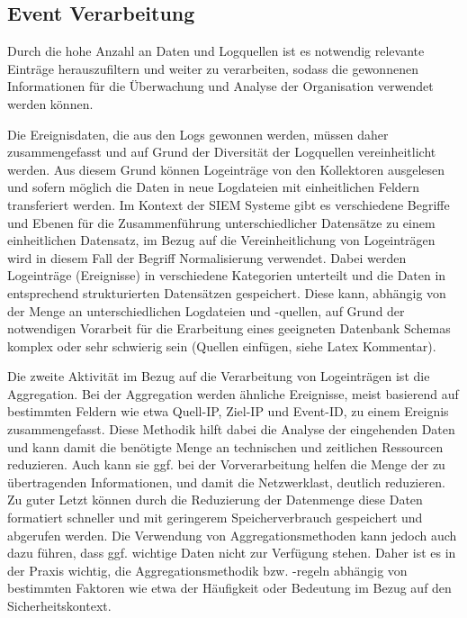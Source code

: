 \subsection{Event Verarbeitung}
\label{cha:Event Verarbeitung}
Durch die hohe Anzahl an Daten und Logquellen ist es notwendig relevante Einträge herauszufiltern und weiter zu verarbeiten, sodass die gewonnenen Informationen für die Überwachung und Analyse der Organisation verwendet werden können.

Die Ereignisdaten, die aus den Logs gewonnen werden, müssen daher zusammengefasst und auf Grund der Diversität der Logquellen vereinheitlicht werden. Aus diesem Grund können Logeinträge von den Kollektoren ausgelesen und sofern möglich die Daten in neue Logdateien mit einheitlichen Feldern transferiert werden. Im Kontext der SIEM Systeme gibt es verschiedene Begriffe und Ebenen für die Zusammenführung unterschiedlicher Datensätze zu einem einheitlichen Datensatz, im Bezug auf die Vereinheitlichung von Logeinträgen wird in diesem Fall der Begriff \glqq Normalisierung \grqq  verwendet. Dabei werden Logeinträge (Ereignisse) in verschiedene Kategorien unterteilt und die Daten in entsprechend strukturierten Datensätzen gespeichert.
Diese kann, abhängig von der Menge an unterschiedlichen Logdateien und -quellen, auf Grund der notwendigen Vorarbeit für die Erarbeitung eines geeigneten Datenbank Schemas komplex oder sehr schwierig sein (Quellen einfügen, siehe Latex Kommentar).

Die zweite Aktivität im Bezug auf die Verarbeitung von Logeinträgen ist die Aggregation. Bei der Aggregation werden ähnliche Ereignisse, meist basierend auf bestimmten Feldern wie etwa Quell-IP, Ziel-IP und Event-ID, zu einem Ereignis zusammengefasst. Diese Methodik hilft dabei die Analyse der eingehenden Daten und kann damit die benötigte Menge an technischen und zeitlichen Ressourcen reduzieren. Auch kann sie ggf. bei der Vorverarbeitung helfen die Menge der zu übertragenden Informationen, und damit die Netzwerklast, deutlich reduzieren. Zu guter Letzt können durch die Reduzierung der Datenmenge diese Daten formatiert schneller und mit geringerem Speicherverbrauch gespeichert und abgerufen werden.
Die Verwendung von Aggregationsmethoden kann jedoch auch dazu führen, dass ggf. wichtige Daten nicht zur Verfügung stehen. Daher ist es in der Praxis wichtig, die Aggregationsmethodik bzw. -regeln abhängig von bestimmten Faktoren wie etwa der Häufigkeit oder Bedeutung im Bezug auf den Sicherheitskontext.

